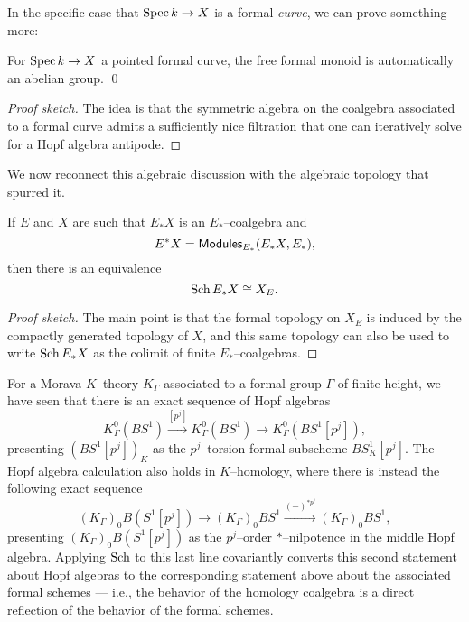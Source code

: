 In the specific case that $\operatorname{Spec} k \to X$ is a formal \emph{curve}, we can prove something more:
\begin{corollary}
For $\operatorname{Spec} k \to X$ a pointed formal curve, the free formal monoid is automatically an abelian group. \qed
\end{corollary}
\begin{proof}[Proof sketch]
The idea is that the symmetric algebra on the coalgebra associated to a formal curve admits a sufficiently nice filtration that one can iteratively solve for a Hopf algebra antipode.
\end{proof}

We now reconnect this algebraic discussion with the algebraic topology that spurred it.

\begin{lemma}
If $E$ and $X$ are such that $E_* X$ is an $E_*$--coalgebra and \[E^* X = \mathsf{Modules}_{E_*}(E_* X, E_*),\] then there is an equivalence \[\Sch E_* X \cong X_E. \qed\]
\end{lemma}
\begin{proof}[Proof sketch]
The main point is that the formal topology on $X_E$ is induced by the compactly generated topology of $X$, and this same topology can also be used to write $\operatorname{Sch} E_* X$ as the colimit of finite $E_*$--coalgebras.
\end{proof}

\begin{example}
For a Morava $K$--theory $K_\Gamma$ associated to a formal group $\Gamma$ of finite height, we have seen that there is an exact sequence of Hopf algebras \[K_\Gamma^0(BS^1) \xrightarrow{[p^j]} K_\Gamma^0(BS^1) \to K_\Gamma^0(BS^1[p^j]),\] presenting $(BS^1[p^j])_K$ as the $p^j$--torsion formal subscheme $BS^1_K[p^j]$.  The Hopf algebra calculation also holds in $K$--homology, where there is instead the following exact sequence \[(K_\Gamma)_0 B(S^1[p^j]) \to (K_\Gamma)_0 BS^1 \xrightarrow{(-)^{\ast p^j}} (K_\Gamma)_0 BS^1,\] presenting $(K_\Gamma)_0 B(S^1[p^j])$ as the $p^j$--order $\ast$--nilpotence in the middle Hopf algebra.  Applying $\operatorname{Sch}$ to this last line covariantly converts this second statement about Hopf algebras to the corresponding statement above about the associated formal schemes --- i.e., the behavior of the homology coalgebra is a direct reflection of the behavior of the formal schemes.
\end{example}

